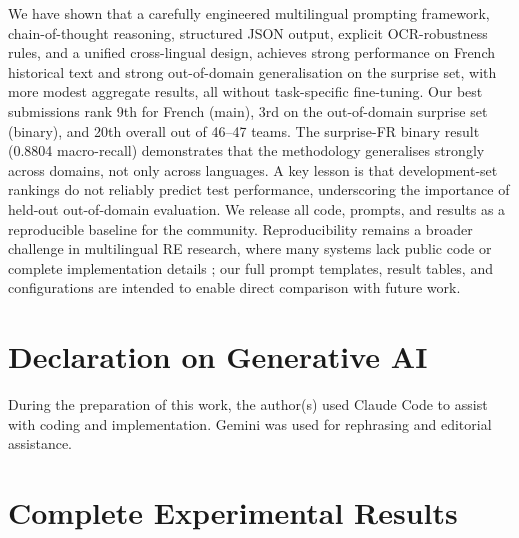 \documentclass[
]{ceurart}
\theoremstyle{definition}
\begin{document}
We have shown that a carefully engineered multilingual prompting framework, chain-of-thought reasoning, structured JSON output, explicit OCR-robustness rules, and a unified cross-lingual design, achieves strong performance on French historical text and strong out-of-domain generalisation on the surprise set, with more modest aggregate results, all without task-specific fine-tuning.
Our best submissions rank 9th for French (main), 3rd on the out-of-domain surprise set (binary), and 20th overall out of 46--47 teams.
The surprise-FR binary result (0.8804 macro-recall) demonstrates that the methodology generalises strongly across domains, not only across languages.
A key lesson is that development-set rankings do not reliably predict test performance, underscoring the importance of held-out out-of-domain evaluation.
We release all code, prompts, and results as a reproducible baseline for the community.
Reproducibility remains a broader challenge in multilingual RE research, where many systems lack public code or complete implementation details \citep{ali2025multilingual}; our full prompt templates, result tables, and configurations are intended to enable direct comparison with future work.

% 



\section*{Declaration on Generative AI}

 During the preparation of this work, the author(s) used Claude Code to assist with coding and implementation. Gemini was used for rephrasing and editorial assistance.


\clearpage
\appendix
\renewcommand{\thesection}{Appendix~\Alph{section}}

\section{Complete Experimental Results}
\label{app:full-results}
\end{document}
